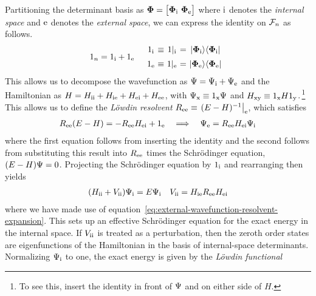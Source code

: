 \documentclass[11pt]{article}
\numberwithin{equation}{section}
\begin{document}
\begin{rmk}
\label{rmk:lowdin-partitioning}
Partitioning the determinant basis as
$
  \bo{\F}
=
\pma{\bo{\F}_\mr{i}\ \bo{\F}_\mr{e}}
$
where $\mathrm{i}$ denotes the \textit{internal space} and $\mathrm{e}$ denotes the \textit{external space}, we can express the identity on $\mathcal{F}_n$ as follows.
\begin{align}
  1_n
=
  1_\mr{i}
+
  1_\mr{e}
&&
\begin{array}{c@{\ }c@{\ }c@{\ }c@{\ }c}
  1_\mr{i}
&
\equiv
&
  1|_\mr{i}
&
=
&
  \kt{\bo{\F}_\mr{i}}
  \br{\bo{\F}_\mr{i}}
\\[5pt]
  1_\mr{e}
&
\equiv
&
  1|_\mr{e}
&
=
&
  \kt{\bo{\F}_\mr{e}}
  \br{\bo{\F}_\mr{e}}
\end{array}
\end{align}
This allows us to decompose the wavefunction as
$
  \Psi 
=
  \Psi _{\mathrm{i}}
+
  \Psi _{\mathrm{e}}
$
and the Hamiltonian as
$
  H
=
  H_{\mathrm{ii}}
+
  H_{\mathrm{ie}}
+
  H_{\mathrm{ei}}
+
  H_{\mathrm{ee}}
$,
with
$
  \Psi _{\mathrm{x}}
\equiv
  1_{\mathrm{x}}
  \Psi 
$
and
$
  H_{\mathrm{xy}}
\equiv
  1_{\mathrm{x}}
  H
  1_{\mathrm{y}}
$.\,\footnote{To see this, insert the identity in front of $\Psi $ and on either side of $H$.}
This allows us to define the
\textit{L\"owdin resolvent}
$
  R_{\mathrm{ee}}
\equiv
  \left.
  (
    E
  -
    H
  )^{-1}
  \right|_{\mathrm{e}}
$,
which satisfies
\begin{align}
\label{eq:external-wavefunction-resolvent-expansion}
  R_{\mathrm{ee}}
  (
    E
  -
    H
  )
=
-
  R_{\mathrm{ee}}
  H_{\mathrm{ei}}
+
  1_{\mathrm{e}}
&&
  \implies
&&
  \Psi _{\mathrm{e}}
=
  R_{\mathrm{ee}}
  H_{\mathrm{ei}}
  \Psi _{\mathrm{i}}
\end{align}
where the first equation follows from inserting the identity and the second follows from substituting this result into $R_{\mathrm{ee}}$ times the Schr\"odinger equation,
$
  (
    E
  -
    H
  )
  \Psi 
=
  0
$.
Projecting the Schr\"odinger equation by $1_{\mathrm{i}}$ and rearranging then yields
\begin{align}
  (
    H_{\mathrm{ii}}
  +
    V_{\mathrm{ii}}
  )
  \Psi _{\mathrm{i}}
=
  E
  \Psi _{\mathrm{i}}
&&
  V_{\mathrm{ii}}
=
  H_{\mathrm{ie}}
  R_{\mathrm{ee}}
  H_{\mathrm{ei}}
\end{align}
where we have made use of equation~\ref{eq:external-wavefunction-resolvent-expansion}.
This sets up an effective Schr\"odinger equation for the exact energy in the internal space.
If $V_{\mathrm{ii}}$ is treated as a perturbation, then the zeroth order states are eigenfunctions of the Hamiltonian in the basis of internal-space determinants.
Normalizing $\Psi _{\mathrm{i}}$ to one, the exact energy is given by the 
\textit{L\"owdin functional}

\end{rmk}
\end{document}
